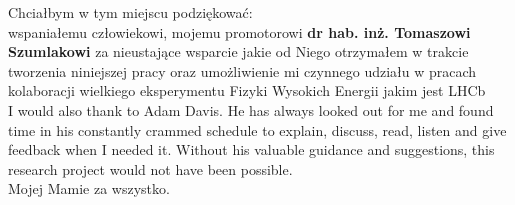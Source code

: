 \noindent Chciałbym w tym miejscu podziękować:\\
wspaniałemu człowiekowi, mojemu promotorowi \textbf{dr hab. inż. Tomaszowi Szumlakowi}  za nieustające wsparcie jakie od Niego otrzymałem w trakcie tworzenia niniejszej pracy oraz umożliwienie mi czynnego udziału w pracach  kolaboracji wielkiego eksperymentu Fizyki Wysokich Energii jakim jest LHCb\\
I would also thank to Adam Davis. He has always looked out for me and found time in his constantly crammed schedule to explain, discuss, read, listen and give feedback when I needed it. Without his valuable guidance and suggestions, this research project would not have been possible. \\
Mojej Mamie za wszystko. 

